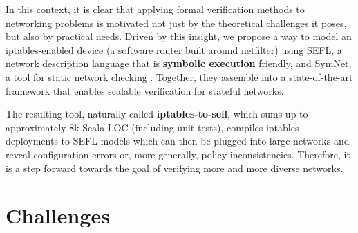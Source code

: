 In this context, it is clear that applying formal verification methods to
networking problems is motivated not just by the theoretical challenges it
poses, but also by practical needs.  Driven by this insight, we propose a way
to model an iptables-enabled device (a software router built around netfilter)
using SEFL, a network
description language that is \textbf{symbolic execution} friendly, and SymNet,
a tool for static network checking \cite{stoenescu2016symnet,
stoenescu2013symnet}.  Together, they assemble into a state-of-the-art
framework that enables scalable verification for stateful networks.

The resulting tool, naturally called \textbf{iptables-to-sefl}, which sums up
to approximately 8k Scala LOC (including unit tests), compiles iptables
deployments to SEFL models which can then be plugged into large networks and
reveal configuration errors or, more generally, policy inconsistencies.
Therefore, it is a step forward towards the goal of verifying more and more
diverse networks.

\section{Challenges}
